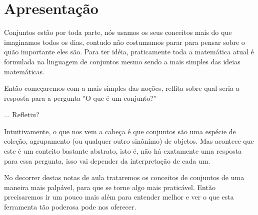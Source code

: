 \section{Apresentação}

Conjuntos estão por toda parte, nós usamos os seus conceitos mais do que imaginamos todos os dias, contudo não costumamos parar para pensar sobre o quão importante eles são.
Para ter idéia, praticamente toda a matemática atual é formulada na linguagem de conjuntos mesmo sendo a mais simples das ideias matemáticas.

Então começaremos com a mais simples das noções, reflita sobre qual seria a resposta para a pergunta "O que é um conjunto?"

... Refletiu?

Intuitivamente, o que nos vem a cabeça é que conjuntos são uma espécie de coleção, agrupamento (ou qualquer outro sinônimo) de objetos.
Mas acontece que este é um conteito bastante abstrato, isto é, não há exatamente uma resposta para essa pergunta, isso vai depender da interpretação de cada um.

No decorrer destas notas de aula trataremos os conceitos de conjuntos de uma maneira mais palpável, para que se torne algo mais praticável.
Então precisaremos ir um pouco mais além para entender melhor e ver o que esta ferramenta tão poderosa pode nos oferecer.

